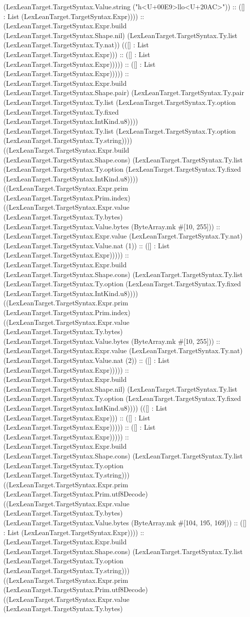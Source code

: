 \documentclass[11pt]{article}
\begin{document}
(LexLeanTarget.TargetSyntax.Value.string ("h<U+00E9>llo<U+20AC>")) :: ([] : List (LexLeanTarget.TargetSyntax.Expr)))) :: (LexLeanTarget.TargetSyntax.Expr.build (LexLeanTarget.TargetSyntax.Shape.nil) (LexLeanTarget.TargetSyntax.Ty.list (LexLeanTarget.TargetSyntax.Ty.nat)) (([] : List (LexLeanTarget.TargetSyntax.Expr))) :: ([] : List (LexLeanTarget.TargetSyntax.Expr))))) :: ([] : List (LexLeanTarget.TargetSyntax.Expr))))) :: (LexLeanTarget.TargetSyntax.Expr.build (LexLeanTarget.TargetSyntax.Shape.pair) (LexLeanTarget.TargetSyntax.Ty.pair (LexLeanTarget.TargetSyntax.Ty.list (LexLeanTarget.TargetSyntax.Ty.option (LexLeanTarget.TargetSyntax.Ty.fixed (LexLeanTarget.TargetSyntax.IntKind.u8)))) (LexLeanTarget.TargetSyntax.Ty.list (LexLeanTarget.TargetSyntax.Ty.option (LexLeanTarget.TargetSyntax.Ty.string)))) ((LexLeanTarget.TargetSyntax.Expr.build (LexLeanTarget.TargetSyntax.Shape.cons) (LexLeanTarget.TargetSyntax.Ty.list (LexLeanTarget.TargetSyntax.Ty.option (LexLeanTarget.TargetSyntax.Ty.fixed (LexLeanTarget.TargetSyntax.IntKind.u8)))) ((LexLeanTarget.TargetSyntax.Expr.prim (LexLeanTarget.TargetSyntax.Prim.index) ((LexLeanTarget.TargetSyntax.Expr.value (LexLeanTarget.TargetSyntax.Ty.bytes) (LexLeanTarget.TargetSyntax.Value.bytes (ByteArray.mk \#[10, 255])) :: (LexLeanTarget.TargetSyntax.Expr.value (LexLeanTarget.TargetSyntax.Ty.nat) (LexLeanTarget.TargetSyntax.Value.nat (1)) :: ([] : List (LexLeanTarget.TargetSyntax.Expr))))) :: (LexLeanTarget.TargetSyntax.Expr.build (LexLeanTarget.TargetSyntax.Shape.cons) (LexLeanTarget.TargetSyntax.Ty.list (LexLeanTarget.TargetSyntax.Ty.option (LexLeanTarget.TargetSyntax.Ty.fixed (LexLeanTarget.TargetSyntax.IntKind.u8)))) ((LexLeanTarget.TargetSyntax.Expr.prim (LexLeanTarget.TargetSyntax.Prim.index) ((LexLeanTarget.TargetSyntax.Expr.value (LexLeanTarget.TargetSyntax.Ty.bytes) (LexLeanTarget.TargetSyntax.Value.bytes (ByteArray.mk \#[10, 255])) :: (LexLeanTarget.TargetSyntax.Expr.value (LexLeanTarget.TargetSyntax.Ty.nat) (LexLeanTarget.TargetSyntax.Value.nat (2)) :: ([] : List (LexLeanTarget.TargetSyntax.Expr))))) :: (LexLeanTarget.TargetSyntax.Expr.build (LexLeanTarget.TargetSyntax.Shape.nil) (LexLeanTarget.TargetSyntax.Ty.list (LexLeanTarget.TargetSyntax.Ty.option (LexLeanTarget.TargetSyntax.Ty.fixed (LexLeanTarget.TargetSyntax.IntKind.u8)))) (([] : List (LexLeanTarget.TargetSyntax.Expr))) :: ([] : List (LexLeanTarget.TargetSyntax.Expr))))) :: ([] : List (LexLeanTarget.TargetSyntax.Expr))))) :: (LexLeanTarget.TargetSyntax.Expr.build (LexLeanTarget.TargetSyntax.Shape.cons) (LexLeanTarget.TargetSyntax.Ty.list (LexLeanTarget.TargetSyntax.Ty.option (LexLeanTarget.TargetSyntax.Ty.string))) ((LexLeanTarget.TargetSyntax.Expr.prim (LexLeanTarget.TargetSyntax.Prim.utf8Decode) ((LexLeanTarget.TargetSyntax.Expr.value (LexLeanTarget.TargetSyntax.Ty.bytes) (LexLeanTarget.TargetSyntax.Value.bytes (ByteArray.mk \#[104, 195, 169])) :: ([] : List (LexLeanTarget.TargetSyntax.Expr)))) :: (LexLeanTarget.TargetSyntax.Expr.build (LexLeanTarget.TargetSyntax.Shape.cons) (LexLeanTarget.TargetSyntax.Ty.list (LexLeanTarget.TargetSyntax.Ty.option (LexLeanTarget.TargetSyntax.Ty.string))) ((LexLeanTarget.TargetSyntax.Expr.prim (LexLeanTarget.TargetSyntax.Prim.utf8Decode) ((LexLeanTarget.TargetSyntax.Expr.value (LexLeanTarget.TargetSyntax.Ty.bytes) 
\end{document}
